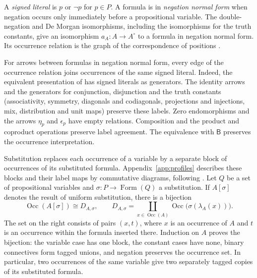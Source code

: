 \documentclass[11pt]{article}
\newcommand{\B}{\mathsf B}
\newcommand{\Occ}{\operatorname{Occ}}
\newcommand{\FormulaSet}{\operatorname{Form}}
\begin{document}
A \emph{signed literal} is $p$ or $\neg p$ for $p\in P$.
A formula is in \emph{negation normal form} when negation occurs only
immediately before a propositional variable. The double-negation and
De Morgan isomorphisms, including the isomorphisms for the truth
constants, give an isomorphism $a_A:A\to A^\circ$ to a formula in
negation normal form. Its occurrence relation is the graph of the
correspondence of positions \cite[\S14.1, pp.~313--315]{DP}.

For arrows between formulas in negation normal form, every edge of
the occurrence relation joins occurrences of the same signed literal.
Indeed, the equivalent presentation of \cite[\S14.2, pp.~318--321]{DP}
has signed literals as generators. The identity arrows and the generators
for conjunction, disjunction and the truth constants (associativity,
symmetry, diagonals and codiagonals, projections and injections, mix,
distribution and unit maps) preserve these labels. Zero endomorphisms
and the arrows $\eta_p$ and $\epsilon_p$ have empty relations. Composition and the product and coproduct
operations preserve label agreement. The equivalence with $\B$ preserves the occurrence
interpretation.

Substitution replaces each occurrence of a variable by a separate
block of occurrences of its substituted formula.
Appendix~\ref{app:profiles} describes these blocks and their label maps
by commutative diagrams, following \cite[\S9]{Notation}.
Let $Q$ be a set of propositional variables and
$\sigma:P\to\FormulaSet(Q)$ a substitution. If $A[\sigma]$ denotes the
result of uniform substitution, there is a bijection
\begin{equation}
 \Occ(A[\sigma])\cong D_{A,\sigma},\qquad
 D_{A,\sigma}=\coprod_{x\in\Occ(A)}
                  \Occ\bigl(\sigma(\lambda_A(x))\bigr).
 \label{eq:occ-substitution}
\end{equation}
The set on the right consists of pairs $(x,t)$, where $x$ is an
occurrence of $A$ and $t$ is an occurrence within the formula inserted there.
Induction on $A$ proves the bijection: the variable case has one
block, the constant cases have none, binary connectives form tagged
unions, and negation preserves the occurrence set. In particular,
two occurrences of the same variable give two separately tagged
copies of its substituted formula.
\end{document}
